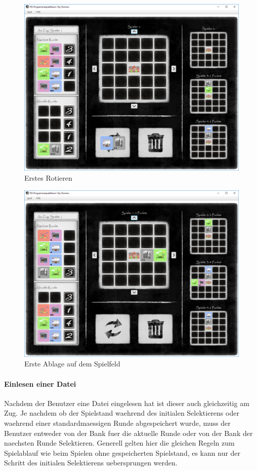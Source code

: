 \begin{figure}
	\centering
	\includegraphics{screenshots/screenshot_ErstesRotieren.png}
	\caption{Erstes Rotieren}
	\label{fig:erstesRotieren}
\end{figure}

\begin{figure}
	\centering
	\includegraphics{screenshots/screenshot_ErsteAblage.png}
	\caption[Erste Ablage]{Erste Ablage auf dem Spielfeld}
	\label{fig:ersteAblage}
\end{figure}

\paragraph{Einlesen einer Datei}
Nachdem der Benutzer eine Datei eingelesen hat ist dieser auch gleichzeitig am Zug. Je nachdem ob der Spielstand waehrend des initialen Selektierens oder waehrend einer standardmaessigen Runde abgespeichert wurde, muss der Benutzer entweder von der Bank fuer die aktuelle Runde oder von der Bank der naechsten Runde Selektieren. Generell gelten hier die gleichen Regeln zum Spielablauf wie beim Spielen ohne gespeicherten Spielstand, es kann nur der Schritt des initialen Selektierens uebersprungen werden. 


